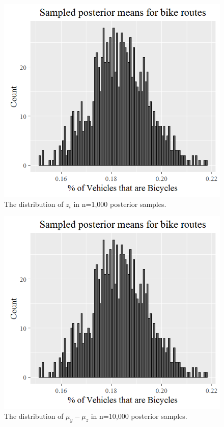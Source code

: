\documentclass{article}
\begin{document}
\begin{figure}[!ht]
  \caption{The distribution of \(z_i\) in n=1,000 posterior samples.}
  \centering
    \includegraphics[width=\textwidth]{Problem38y}
\end{figure}    

\begin{figure}[!ht]
  \caption{The distribution of \(\mu_y - \mu_z\) in n=10,000 posterior samples.}
  \centering
    \includegraphics[width=\textwidth]{Problem38y}
\end{figure}    
\end{document}
